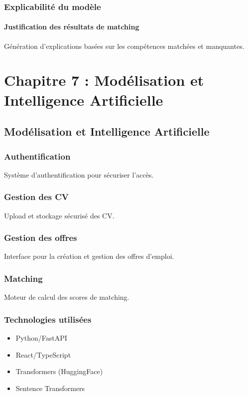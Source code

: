 \documentclass[12pt,a4paper]{report}
\begin{document}
\section{Explicabilité du modèle}

\subsection{Justification des résultats de matching}
Génération d'explications basées sur les compétences matchées et manquantes.

\part{Chapitre 7 : Modélisation et Intelligence Artificielle}
\chapter{Modélisation et Intelligence Artificielle}

\section{Authentification}
Système d'authentification pour sécuriser l'accès.

\section{Gestion des CV}
Upload et stockage sécurisé des CV.

\section{Gestion des offres}
Interface pour la création et gestion des offres d'emploi.

\section{Matching}
Moteur de calcul des scores de matching.

\section{Technologies utilisées}
\begin{itemize}
\item Python/FastAPI
\item React/TypeScript
\item Transformers (HuggingFace)
\item Sentence Transformers
\end{itemize}
\end{document}
